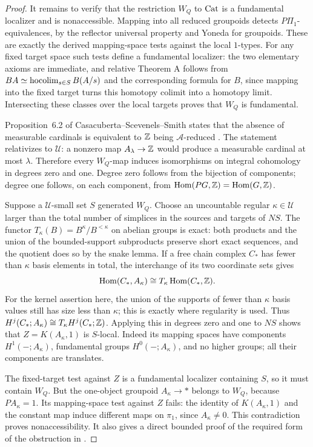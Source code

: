\begin{proof}
It remains to verify that the restriction $W_Q$ to $\mathrm{Cat}$ is
a fundamental localizer and is nonaccessible. Mapping into all
reduced groupoids detects $P\Pi_1$-equivalences, by the reflector
universal property and Yoneda for groupoids. These are exactly
the derived mapping-space tests against the local $1$-types.
For any fixed target space such tests define a fundamental
localizer: the two elementary axioms are immediate, and relative
Theorem A follows from
$BA\simeq\operatorname*{hocolim}_{s\in S}B(A/s)$ and the corresponding
formula for $B$, since mapping into the fixed target turns this
homotopy colimit into a homotopy limit. Intersecting these classes
over the local targets proves that $W_Q$ is fundamental.

Proposition~6.2 of Casacuberta--Scevenels--Smith states that the
absence of measurable cardinals is equivalent to $\mathbb Z$ being
$\mathcal A$-reduced \cite{I_CSS2005}. The statement relativizes
to $\mathcal U$: a nonzero map $A_\lambda\to\mathbb Z$ would produce
a measurable cardinal at most $\lambda$. Therefore every
$W_Q$-map induces isomorphisms on integral cohomology in degrees
zero and one. Degree zero follows from the bijection of
components; degree one follows, on each component, from
$\operatorname{Hom}(PG,\mathbb Z)=\operatorname{Hom}(G,\mathbb Z)$.

Suppose a $\mathcal U$-small set $S$ generated $W_Q$. Choose
an uncountable regular $\kappa\in\mathcal U$ larger than the
total number of simplices in the sources and targets of $NS$.
The functor $T_\kappa(B)=B^\kappa/B^{<\kappa}$ on abelian
groups is exact: both products and the union of the bounded-support
subproducts preserve short exact sequences, and the quotient
does so by the snake lemma. If a free chain complex $C_*$ has
fewer than $\kappa$ basis elements in total, the interchange of
its two coordinate sets gives
\[
 \operatorname{Hom}(C_*,A_\kappa)
       \cong T_\kappa\operatorname{Hom}(C_*,\mathbb Z).
\]
For the kernel assertion here, the union of the supports of
fewer than $\kappa$ basis values still has size less than
$\kappa$; this is exactly where regularity is used. Thus
$H^j(C_*;A_\kappa)\cong T_\kappa H^j(C_*;\mathbb Z)$.
Applying this in degrees zero and one to $NS$ shows that
$Z=K(A_\kappa,1)$ is $S$-local. Indeed its mapping spaces have
components $H^1(-;A_\kappa)$, fundamental groups
$H^0(-;A_\kappa)$, and no higher groups; all their components
are translates.

The fixed-target test against $Z$ is a fundamental localizer
containing $S$, so it must contain $W_Q$. But the one-object
groupoid $A_\kappa\to *$ belongs to $W_Q$, because
$P A_\kappa=1$. Its mapping-space test against $Z$ fails:
the identity of $K(A_\kappa,1)$ and the constant map induce
different maps on $\pi_1$, since $A_\kappa\ne0$. This
contradiction proves nonaccessibility. It also gives a direct
bounded proof of the required form of the obstruction in
\cite[Theorems~6.3--6.4]{I_CSS2005}.


\end{proof}
